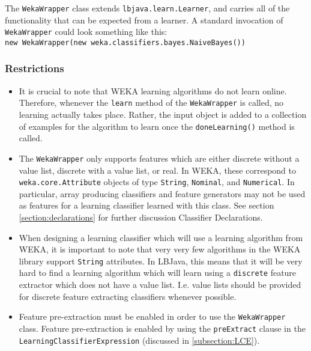The {\tt WekaWrapper} class extends {\tt lbjava.learn.Learner}, and carries all
of the functionality that can be expected from a learner.  A standard
invocation of {\tt WekaWrapper} could look something like this: \\

{\tt new WekaWrapper(new weka.classifiers.bayes.NaiveBayes())} 

\subsubsection*{Restrictions}
\begin{itemize}

\item
  It is crucial to note that WEKA learning algorithms do not learn online.
  Therefore, whenever the {\tt learn} method of the {\tt WekaWrapper} is
  called, no learning actually takes place.  Rather, the input object is added
  to a collection of examples for the algorithm to learn once the
  {\tt doneLearning()} method is called.

\item
  The {\tt WekaWrapper} only supports features which are either discrete
  without a value list, discrete with a value list, or real.  In WEKA, these
  correspond to {\tt weka.core.Attribute} objects of type {\tt String},
  {\tt Nominal}, and {\tt Numerical}.  In particular, array producing
  classifiers and feature generators may not be used as features for a
  learning classifier learned with this class.  See section
  \ref{section:declarations} for further discussion Classifier Declarations.

\item
  When designing a learning classifier which will use a learning algorithm
  from WEKA, it is important to note that very very few algorithms in the WEKA
  library support {\tt String} attributes.  In LBJava, this means that it will be
  very hard to find a learning algorithm which will learn using a
  {\tt discrete} feature extractor which does not have a value list.  I.e.
  value lists should be provided for discrete feature extracting classifiers
  whenever possible. 

\item
  Feature pre-extraction must be enabled in order to use the {\tt WekaWrapper}
  class.  Feature pre-extraction is enabled by using the {\tt preExtract}
  clause in the {\tt LearningClassifierExpression} (discussed in
  \ref{subsection:LCE}).

\end{itemize}


